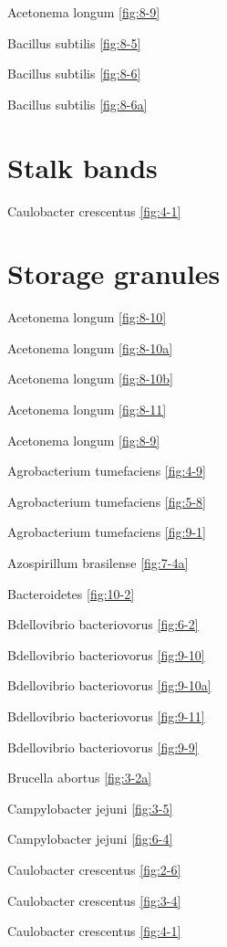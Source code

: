 \documentclass[]{tufte-book}
\begin{document}
Acetonema longum \ref{fig:8-9}

Bacillus subtilis \ref{fig:8-5}

Bacillus subtilis \ref{fig:8-6}

Bacillus subtilis \ref{fig:8-6a}

\hypertarget{stalk-bands}{%
\section*{Stalk bands}\label{stalk-bands}}

Caulobacter crescentus \ref{fig:4-1}

\hypertarget{storage-granules}{%
\section*{Storage granules}\label{storage-granules}}

Acetonema longum \ref{fig:8-10}

Acetonema longum \ref{fig:8-10a}

Acetonema longum \ref{fig:8-10b}

Acetonema longum \ref{fig:8-11}

Acetonema longum \ref{fig:8-9}

Agrobacterium tumefaciens \ref{fig:4-9}

Agrobacterium tumefaciens \ref{fig:5-8}

Agrobacterium tumefaciens \ref{fig:9-1}

Azospirillum brasilense \ref{fig:7-4a}

Bacteroidetes \ref{fig:10-2}

Bdellovibrio bacteriovorus \ref{fig:6-2}

Bdellovibrio bacteriovorus \ref{fig:9-10}

Bdellovibrio bacteriovorus \ref{fig:9-10a}

Bdellovibrio bacteriovorus \ref{fig:9-11}

Bdellovibrio bacteriovorus \ref{fig:9-9}

Brucella abortus \ref{fig:3-2a}

Campylobacter jejuni \ref{fig:3-5}

Campylobacter jejuni \ref{fig:6-4}

Caulobacter crescentus \ref{fig:2-6}

Caulobacter crescentus \ref{fig:3-4}

Caulobacter crescentus \ref{fig:4-1}
\end{document}
